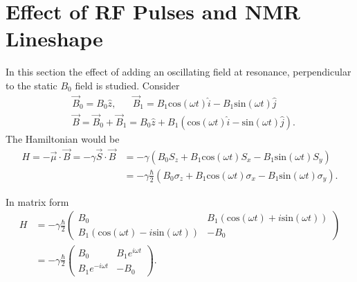 \section{Effect of RF Pulses and NMR Lineshape\label{sec:rfpulse}}
In this section the effect of adding an oscillating field at
resonance, perpendicular to the static $B_0$ field is studied. Consider
%
\begin{equation}
\begin{split}
&\vec{B}_{0} = B_{0} \hat{z}, \;\;\;\;\;\;
\vec{B}_{1} = B_{1}\textrm{cos}(\omega t) \hat{i} - B_{1} \textrm{sin} (\omega t) \hat{j} \\
%
&\vec{B} = \vec{B}_{0} + \vec{B}_{1} = B_{0}\hat{z} + B_{1}(\textrm{cos}(\omega t) \hat{i} - \textrm{sin}(\omega t) \hat{j}).
\end{split}
\end{equation}
The Hamiltonian would be
\begin{equation}
\begin{split}
H= -\vec{\mu}\cdot \vec{B} = -\gamma \vec{S} \cdot \vec{B} 
& = -\gamma(B_{0}S_{z} + B_{1}\textrm{cos}(\omega t)S_{x} - B_{1}\textrm{sin}(\omega t)S_{y}) \\
& = -\gamma \frac{\hbar}{2}(B_{0}\sigma_{z} + B_{1}\textrm{cos}(\omega t)\sigma_{x} - B_{1}\textrm{sin}(\omega t)\sigma_{y}).
\end{split}
\end{equation}

In matrix form
\begin{equation}
\begin{split}
  H &= -\gamma \frac{\hbar}{2} \begin{pmatrix} B_{0} & B_{1}(\textrm{cos}(\omega t) + i\textrm{sin}(\omega t)) \\ B_{1}(\textrm{cos}(\omega t) - i\textrm{sin}(\omega t)) & -B_{0} \end{pmatrix} \\
%
&= -\gamma \frac{\hbar}{2} \begin{pmatrix} B_{0} & B_{1} e^{i\omega t} \\ B_{1}e^{-i\omega t} & -B_{0} \end{pmatrix}.
\end{split}
\end{equation}

